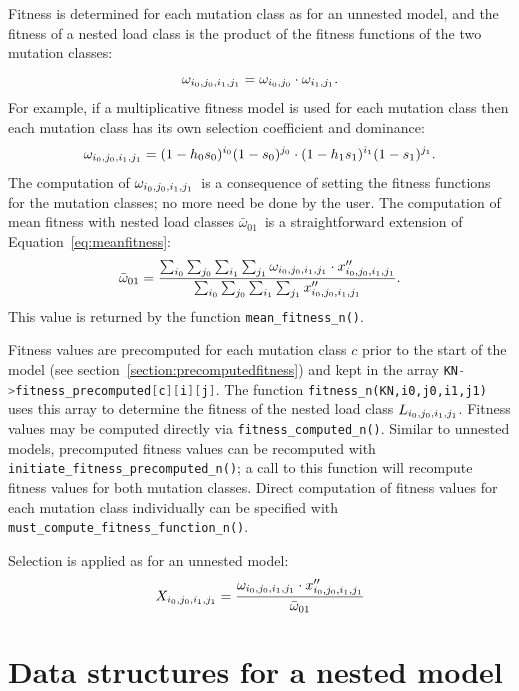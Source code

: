 \documentclass[12pt,twoside,letterpaper,fleqn]{report}
\numberwithin{equation}{section}  %
\newcommand{\Lijij}{\mbox{$L_{i_0\/,j_0\/,i_1\/,j_1\/}$}}
\newcommand{\wnested}{\mbox{$\omega_{i_0\/,j_0\/,i_1\/,j_1\/}$}}
\newcommand{\meanwnested}{\mbox{$\bar{\omega}_{01}$}}
\newcommand{\xppijij}{\mbox{$x''_{i_0\/,j_0\/,i_1\/,j_1\/}$}}
\newcommand{\Xijij}{\mbox{$X_{i_0\/,j_0\/,i_1\/,j_1\/}$}}
\begin{document}
{Fitness is determined for each mutation class as for an unnested model, and the fitness of a nested load class is the product of the fitness functions of the two mutation classes:
\begin{equation}
\wnested = \omega_{i_0,j_0} \cdot \omega_{i_1,j_1}.
\end{equation}
For example, if a multiplicative fitness model is used for each mutation class then each mutation class has its own selection coefficient and dominance:
\begin{equation}
\wnested = (1-h_0 s_0)^{i_0}(1-s_0)^{j_0} \cdot (1-h_1 s_1)^{i_1}(1-s_1)^{j_1}.
\end{equation}
The computation of \wnested\ is a consequence of setting the fitness functions for the mutation classes; no more need be done by the user.  The computation of mean fitness with nested load classes \meanwnested\ is a straightforward extension of Equation~\eqref{eq:meanfitness}:
\begin{equation}\label{eq:meanfitnessnested}
\meanwnested = \frac{\sum_{i_0}{\sum_{j_0}{\sum_{i_1}{\sum_{j_1}{\wnested\cdot\xppijij}}}}}
               {\sum_{i_0}{\sum_{j_0}{\sum_{i_1}{\sum_{j_1}{\xppijij}}}}}.
\end{equation}
This value is returned by the function \lstinline{mean_fitness_n()}.

Fitness values are precomputed for each mutation class $c$\/ prior to the start of the model (see section~\ref{section:precomputedfitness}) and kept in the array \lstinline[language=C]{KN->fitness_precomputed[c][i][j]}.  The function \lstinline{fitness_n(KN,i0,j0,i1,j1)} uses this array to determine the fitness of the nested load class \Lijij.  Fitness values may be computed directly via \lstinline{fitness_computed_n()}.  Similar to unnested models, precomputed fitness values can be recomputed with \lstinline{initiate_fitness_precomputed_n()}; a call to this function will recompute fitness values for both mutation classes.  Direct computation of fitness values for each mutation class individually can be specified with \lstinline{must_compute_fitness_function_n()}.

Selection is applied as for an unnested model:
\begin{equation}\label{eq:selectionnested}
\Xijij = \frac{\wnested\cdot\xppijij}{\meanwnested}
\end{equation}

\section{Data structures for a nested model}

}
\end{document}
